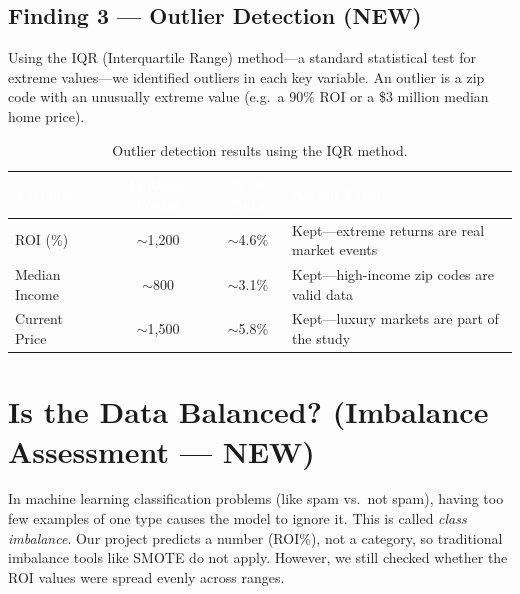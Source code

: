 \documentclass[12pt, a4paper]{article}
\newcommand{\hrow}{\rowcolor{rowblue}}
\begin{document}
\subsection*{Finding 3 --- Outlier Detection \textnormal{(NEW)}}

Using the IQR (Interquartile Range) method---a standard statistical test for extreme values---we identified
outliers in each key variable. An outlier is a zip code with an unusually extreme value (e.g.\ a 90\% ROI or a
\$3 million median home price).

\begin{table}[H]
\centering
\renewcommand{\arraystretch}{1.4}
\begin{tabular}{lccl}
\toprule
\rowcolor{headerblue}
\textcolor{white}{\textbf{Variable}} &
\textcolor{white}{\textbf{Outliers Found}} &
\textcolor{white}{\textbf{\% of Data}} &
\textcolor{white}{\textbf{Action Taken}} \\
\midrule
ROI (\%)       & $\sim$1,200 & $\sim$4.6\% & Kept---extreme returns are real market events \\
\hrow Median Income  & $\sim$800   & $\sim$3.1\% & Kept---high-income zip codes are valid data \\
Current Price  & $\sim$1,500 & $\sim$5.8\% & Kept---luxury markets are part of the study \\
\bottomrule
\end{tabular}
\caption{Outlier detection results using the IQR method.}
\end{table}

\section{Is the Data Balanced? (Imbalance Assessment --- NEW)}

In machine learning classification problems (like spam vs.\ not spam), having too few examples of one type
causes the model to ignore it. This is called \textit{class imbalance}. Our project predicts a number (ROI\%),
not a category, so traditional imbalance tools like SMOTE do not apply. However, we still checked whether the
ROI values were spread evenly across ranges.
\end{document}
